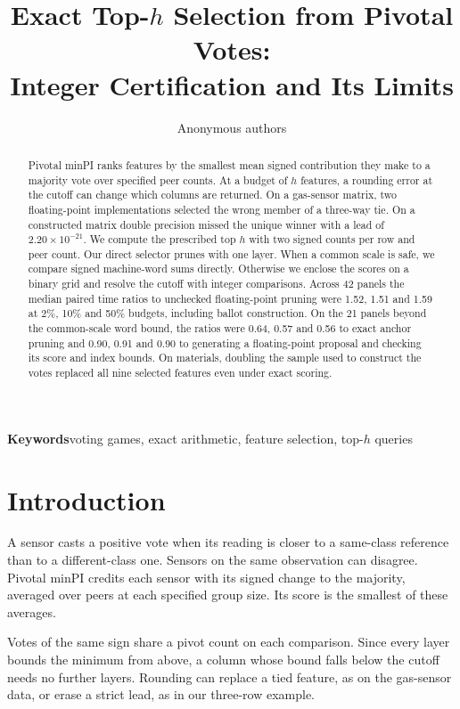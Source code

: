 \documentclass{article}
\title{Exact Top-$h$ Selection from Pivotal Votes:\\Integer Certification and Its Limits}
\author{Anonymous authors}
\begin{document}
\maketitle
\lhead{}
\renewcommand{\headrulewidth}{0pt}
\begin{abstract}
Pivotal minPI ranks features by the smallest mean signed contribution they make to a majority vote over specified peer counts. At a budget of $h$ features, a rounding error at the cutoff can change which columns are returned. On a gas-sensor matrix, two floating-point implementations selected the wrong member of a three-way tie. On a constructed matrix double precision missed the unique winner with a lead of $2.20\times10^{-21}$. We compute the prescribed top $h$ with two signed counts per row and peer count. Our direct selector prunes with one layer. When a common scale is safe, we compare signed machine-word sums directly. Otherwise we enclose the scores on a binary grid and resolve the cutoff with integer comparisons. Across 42 panels the median paired time ratios to unchecked floating-point pruning were 1.52, 1.51 and 1.59 at 2\%, 10\% and 50\% budgets, including ballot construction. On the 21 panels beyond the common-scale word bound, the ratios were 0.64, 0.57 and 0.56 to exact anchor pruning and 0.90, 0.91 and 0.90 to generating a floating-point proposal and checking its score and index bounds. On materials, doubling the sample used to construct the votes replaced all nine selected features even under exact scoring.

\end{abstract}
\noindent\textbf{Keywords}\quad voting games, exact arithmetic, feature selection, top-$h$ queries

\section{Introduction}
A sensor casts a positive vote when its reading is closer to a same-class reference than to a different-class one. Sensors on the same observation can disagree. Pivotal minPI credits each sensor with its signed change to the majority, averaged over peers at each specified group size. Its score is the smallest of these averages.

Votes of the same sign share a pivot count on each comparison. Since every layer bounds the minimum from above, a column whose bound falls below the cutoff needs no further layers. Rounding can replace a tied feature, as on the gas-sensor data, or erase a strict lead, as in our three-row example.
\end{document}
